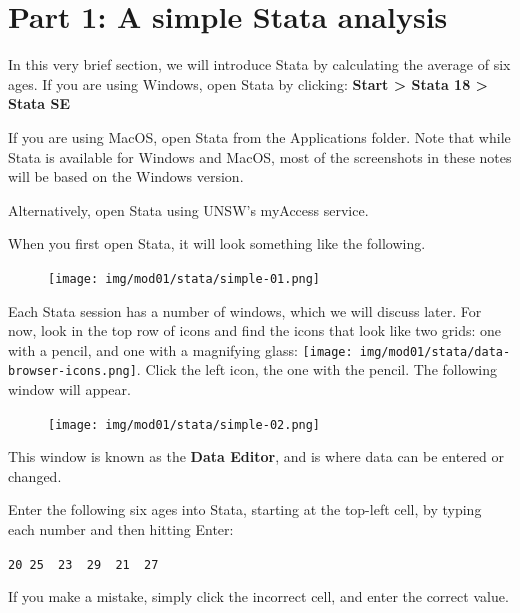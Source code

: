 \documentclass[
  a4paper,
]{memoir}
\begin{document}
\hypertarget{part-1-a-simple-stata-analysis}{%
\section{Part 1: A simple Stata
analysis}\label{part-1-a-simple-stata-analysis}}

In this very brief section, we will introduce Stata by calculating the
average of six ages. If you are using Windows, open Stata by clicking:
\textbf{Start \textgreater{} Stata 18 \textgreater{} Stata SE}

If you are using MacOS, open Stata from the Applications folder. Note
that while Stata is available for Windows and MacOS, most of the
screenshots in these notes will be based on the Windows version.

Alternatively, open Stata using UNSW's myAccess service.

When you first open Stata, it will look something like the following.

\begin{figure}[H]

{\centering \texttt{[image: img/mod01/stata/simple-01.png]}

}

\end{figure}

Each Stata session has a number of windows, which we will discuss later.
For now, look in the top row of icons and find the icons that look like
two grids: one with a pencil, and one with a magnifying glass:
\texttt{[image: img/mod01/stata/data-browser-icons.png]}. Click the left
icon, the one with the pencil. The following window will appear.

\begin{figure}[H]

{\centering \texttt{[image: img/mod01/stata/simple-02.png]}

}

\end{figure}

This window is known as the \textbf{Data Editor}, and is where data can
be entered or changed.

\begin{tcolorbox}[enhanced jigsaw, title={TASK}, opacitybacktitle=0.6, colbacktitle=quarto-callout-note-color!10!white, titlerule=0mm, colframe=quarto-callout-note-color-frame, opacityback=0, left=2mm, breakable, bottomtitle=1mm, coltitle=black, bottomrule=.15mm, arc=.35mm, rightrule=.15mm, toptitle=1mm, colback=white, toprule=.15mm, leftrule=.75mm]

Enter the following six ages into Stata, starting at the top-left cell,
by typing each number and then hitting Enter:

\texttt{20\ 25\ \ 23\ \ 29\ \ 21\ \ 27}

If you make a mistake, simply click the incorrect cell, and enter the
correct value.

\end{tcolorbox}
\end{document}
